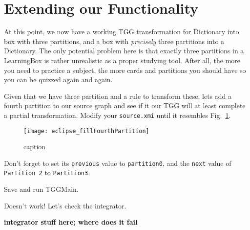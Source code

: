 \newpage
\section{Extending our Functionality}
\genHeader







At this point, we now have a working TGG transformation for Dictionary into box with three partitions, and a box with \emph{precisely} three partitions into a
Dictionary. The only potential problem here is that exactly three partitions in a LearningBox is rather unrealistic as a proper studying tool. After all, the
more you need to practice a subject, the more cards and partitions you should have so you can be quizzed again and again.

Given that we have three partition and a rule to transform these, lets add a fourth partition to our source graph and see if it our TGG will at least complete
a partial transformation. Modify your \texttt{source.xmi} until it resembles Fig.~\ref{fig:fourthPartitionStart}.

\begin{figure}[htbp]
\begin{center}
  \texttt{[image: eclipse\_fillFourthPartition]}
  \caption{caption}
  \label{fig:fourthPartitionStart}
\end{center}
\end{figure}

Don't forget to set its \texttt{previous} value to \texttt{partition0}, and the \texttt{next} value of \texttt{Partition 2} to \texttt{Partition3}.

Save and run TGGMain.


Doesn't work! Let's check the integrator.

{\bf integrator stuff here; where does it fail}


